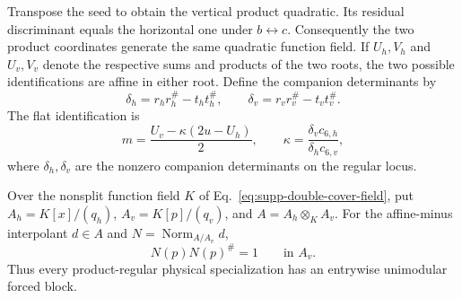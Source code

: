 Transpose the seed to obtain the vertical product quadratic.  Its residual discriminant equals the horizontal one under $b\leftrightarrow c$. Consequently the two product coordinates generate the same quadratic function field.  If $U_h,V_h$ and $U_v,V_v$ denote the respective sums and products of the two roots, the two possible identifications are affine in either root.  Define the companion determinants by
\begin{equation}
\delta_h=r_hr_h^\#-t_ht_h^\#,
\qquad
\delta_v=r_vr_v^\#-t_vt_v^\#.
\label{eq:supp-companion-determinants}
\end{equation}
The flat identification is
\begin{equation}
m=\frac{U_v-\kappa(2u-U_h)}{2},\qquad
\kappa=\frac{\delta_vc_{6,h}}{\delta_hc_{6,v}},
\label{eq:supp-minus-matching}
\end{equation}
where $\delta_h,\delta_v$ are the nonzero companion determinants on the regular locus.


\begin{proposition}
\label{prop:supp-generic-flatness}
{Over the nonsplit function field $K$ of Eq.~\eqref{eq:supp-double-cover-field}, put $A_h=K[x]/(q_h)$, $A_v=K[p]/(q_v)$, and $A=A_h\otimes_KA_v$.  For the affine-minus interpolant $d\in A$ and $N=\operatorname{Norm}_{A/A_v}d$,}
\begin{equation}
{N(p)N(p)^\#=1\qquad\text{in }A_v.}
\label{eq:supp-flatness-cubic-norm-identity}
\end{equation}
{Thus every product-regular physical specialization has an entrywise unimodular forced block.}
\end{proposition}

